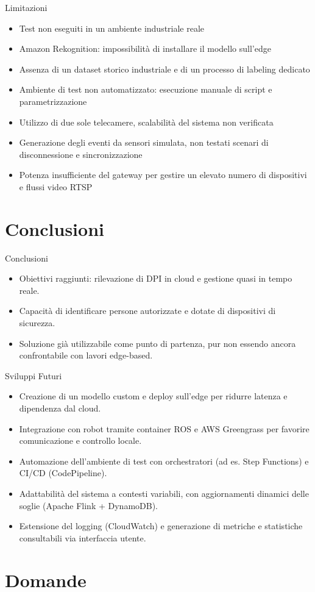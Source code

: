 \documentclass{beamer}
\begin{document}
\begin{frame}{Limitazioni}
\begin{itemize}
    \item Test non eseguiti in un ambiente industriale reale
    \item Amazon Rekognition: impossibilità di installare il modello sull'edge
    \item Assenza di un dataset storico industriale e di un processo di labeling dedicato
    \item Ambiente di test non automatizzato: esecuzione manuale di script e parametrizzazione
    \item Utilizzo di due sole telecamere, scalabilità del sistema non verificata
    \item Generazione degli eventi da sensori simulata, non testati scenari di disconnessione e sincronizzazione
    \item Potenza insufficiente del gateway per gestire un elevato numero di dispositivi e flussi video RTSP
\end{itemize}
\end{frame}

\section{Conclusioni}

\begin{frame}{Conclusioni}
\begin{itemize}
    \item Obiettivi raggiunti: rilevazione di DPI in cloud e gestione quasi in tempo reale.
    \item Capacità di identificare persone autorizzate e dotate di dispositivi di sicurezza.
    \item Soluzione già utilizzabile come punto di partenza, pur non essendo ancora confrontabile con lavori edge-based.
\end{itemize}
\end{frame}

\begin{frame}{Sviluppi Futuri}
\begin{itemize}
    \item Creazione di un modello custom e deploy sull’edge per ridurre latenza e dipendenza dal cloud.
    \item Integrazione con robot tramite container ROS e AWS Greengrass per favorire comunicazione e controllo locale.
    \item Automazione dell’ambiente di test con orchestratori (ad es. Step Functions) e CI/CD (CodePipeline).
    \item Adattabilità del sistema a contesti variabili, con aggiornamenti dinamici delle soglie (Apache Flink + DynamoDB).
    \item Estensione del logging (CloudWatch) e generazione di metriche e statistiche consultabili via interfaccia utente.
\end{itemize}
\end{frame}


\section*{Domande}

\backmatter
\end{document}
